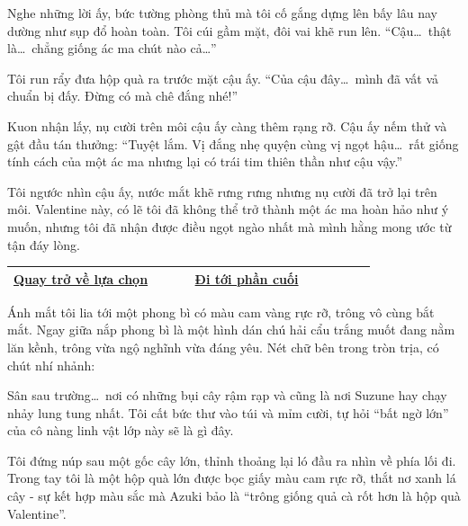 \documentclass[../main.tex]{subfiles}
\begin{document}
Nghe những lời ấy, bức tường phòng thủ mà tôi cố gắng dựng lên bấy lâu nay dường như sụp đổ hoàn toàn. Tôi cúi gầm mặt, đôi vai khẽ run lên. ``Cậu\dots\ thật là\dots\ chẳng giống ác ma chút nào cả\dots''

Tôi run rẩy đưa hộp quà ra trước mặt cậu ấy. ``Của cậu đây\dots\ mình đã vất vả chuẩn bị đấy. Đừng có mà chê đắng nhé!''

Kuon nhận lấy, nụ cười trên môi cậu ấy càng thêm rạng rỡ. Cậu ấy nếm thử và gật đầu tán thưởng: ``Tuyệt lắm. Vị đắng nhẹ quyện cùng vị ngọt hậu\dots\ rất giống tính cách của một ác ma nhưng lại có trái tim thiên thần như cậu vậy.''

Tôi ngước nhìn cậu ấy, nước mắt khẽ rưng rưng nhưng nụ cười đã trở lại trên môi. Valentine này, có lẽ tôi đã không thể trở thành một ác ma hoàn hảo như ý muốn, nhưng tôi đã nhận được điều ngọt ngào nhất mà mình hằng mong ước từ tận đáy lòng.

\begin{table}[H]
  \centering
  \setlength{\arrayrulewidth}{1pt}
  \begin{tabular}{|>{\centering\arraybackslash}p{0.4\linewidth}|>{\centering\arraybackslash}p{0.4\linewidth}|}
    \hline
    \hyperref[choice]{Quay trở về lựa chọn} & \hyperref[ending]{Đi tới phần cuối} \\ \hline
  \end{tabular}
\end{table}

\newpage
\label{suzune}

Ánh mắt tôi lia tới một phong bì có màu cam vàng rực rỡ, trông vô cùng bắt mắt. Ngay giữa nắp phong bì là một hình dán chú hải cẩu trắng muốt đang nằm lăn kềnh, trông vừa ngộ nghĩnh vừa đáng yêu. Nét chữ bên trong tròn trịa, có chút nhí nhảnh:


Sân sau trường\dots\ nơi có những bụi cây rậm rạp và cũng là nơi Suzune hay chạy nhảy lung tung nhất. Tôi cất bức thư vào túi và mỉm cười, tự hỏi ``bất ngờ lớn'' của cô nàng linh vật lớp này sẽ là gì đây.

\ct


Tôi đứng núp sau một gốc cây lớn, thỉnh thoảng lại ló đầu ra nhìn về phía lối đi. Trong tay tôi là một hộp quà lớn được bọc giấy màu cam rực rỡ, thắt nơ xanh lá cây - sự kết hợp màu sắc mà Azuki bảo là ``trông giống quả cà rốt hơn là hộp quà Valentine''.
\end{document}
